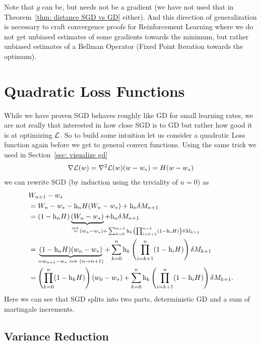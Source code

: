 Note that \(g\) can be, but needs not be a gradient (we have not used that in
Theorem~\ref{thm: distance SGD vs GD} either). And this direction of
generalization is necessary to craft convergence proofs for Reinforcement
Learning where we do not get unbiased estimates of some gradients towards the
minimum, but rather unbiased estimates of a Bellman Operator (Fixed Point 
Iteration towards the optimum).


\section{Quadratic Loss Functions}

While we have proven SGD behaves roughly like GD for small learning rates, we
are not really that interested in how close SGD is to GD but rather how good it
is at optimizing \(\mathcal{L}\). So to build some intuition let us consider a
quadratic Loss function again before we get to general convex functions.
Using the same trick we used in Section~\ref{sec: visualize gd} 
\begin{align*}
	\nabla\mathcal{L}(w)
	= \nabla^2\mathcal{L}(w)(w-w_*)
	= H(w-w_*)
\end{align*}
we can rewrite SGD (by induction using the triviality of \(n=0\)) as
\begin{align}
	\nonumber
	&\Weights_{n+1}-\minimum\\
	\nonumber
	&= \Weights_n - \minimum - \lr_n H(\Weights_n-\minimum) + \lr_n\martIncr_{n+1}\\
	\label{eq: recursive SGD formula in the quadratic case}
	&=(1-\lr_n H)\underbrace{(\Weights_n - \minimum)}_{
		\xeq{\text{ind.}} (\weights_n - \minimum)
		\mathrlap{+ \sum_{k=0}^{n-1}\lr_k\left(\prod_{i=k+1}^{n-1}(1-\lr_iH)\right)\martIncr_{k+1}}
	} + \lr_n\martIncr_{n+1}\\
	\nonumber
	&= \underbrace{(1-\lr_n H)(\weights_n - \minimum)}_{=\weights_{n+1}-\minimum \implies (n\to n+1)}
	+ \sum_{k=0}^n\lr_k\left(\prod_{i=k+1}^n(1-\lr_iH)\right)\martIncr_{k+1}\\
	\label{eq: unrolled SGD weights (general quadratic loss case)}
	&=\left(\prod_{k=0}^n(1-\lr_kH)\right)(\weights_0-\minimum)
	+ \sum_{k=0}^n\lr_k\left(\prod_{i=k+1}^n(1-\lr_iH)\right)\martIncr_{k+1}.
\end{align}
Here we can see that SGD splits into two parts, deterministic GD and a sum of
martingale increments.

\subsection{Variance Reduction}\label{subsec: variance reduction}

